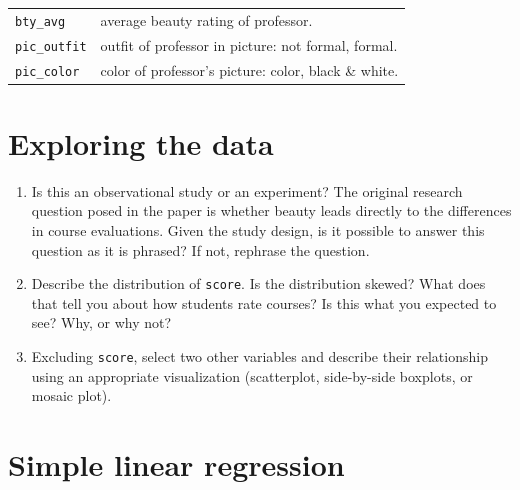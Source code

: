 \documentclass[]{book}
\theoremstyle{definition}
\theoremstyle{definition}
\theoremstyle{remark}
\begin{document}
\begin{longtable}[]{@{}ll@{}}
\begin{minipage}[t]{0.22\columnwidth}
\texttt{bty\_avg}\strut
\end{minipage} & \begin{minipage}[t]{0.16\columnwidth}\raggedright\strut
average beauty rating of professor.\strut
\end{minipage}\tabularnewline
\begin{minipage}[t]{0.22\columnwidth}\raggedright\strut
\texttt{pic\_outfit}\strut
\end{minipage} & \begin{minipage}[t]{0.16\columnwidth}\raggedright\strut
outfit of professor in picture: not formal, formal.\strut
\end{minipage}\tabularnewline
\begin{minipage}[t]{0.22\columnwidth}\raggedright\strut
\texttt{pic\_color}\strut
\end{minipage} & \begin{minipage}[t]{0.16\columnwidth}\raggedright\strut
color of professor's picture: color, black \& white.\strut
\end{minipage}\tabularnewline
\bottomrule
\end{longtable}

\section*{Exploring the data}\label{exploring-the-data}

\begin{enumerate}
\def\labelenumi{\arabic{enumi}.}
\item
  Is this an observational study or an experiment? The original research
  question posed in the paper is whether beauty leads directly to the
  differences in course evaluations. Given the study design, is it
  possible to answer this question as it is phrased? If not, rephrase
  the question.
\item
  Describe the distribution of \texttt{score}. Is the distribution
  skewed? What does that tell you about how students rate courses? Is
  this what you expected to see? Why, or why not?
\item
  Excluding \texttt{score}, select two other variables and describe
  their relationship using an appropriate visualization (scatterplot,
  side-by-side boxplots, or mosaic plot).
\end{enumerate}

\section*{Simple linear regression}\label{simple-linear-regression}
\end{document}
